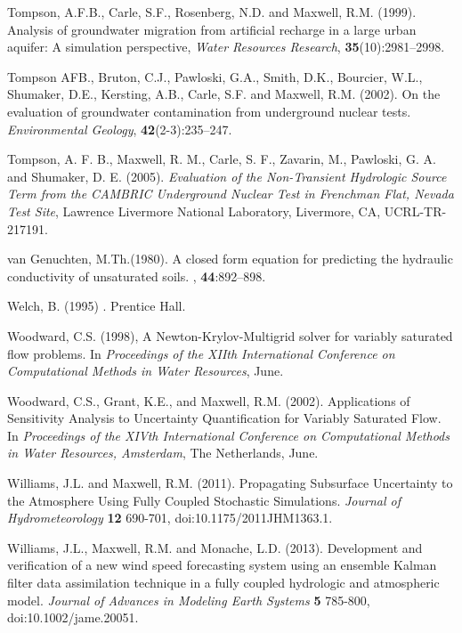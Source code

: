 \begin{thebibliography}{999}
  Tompson, A.F.B., Carle, S.F., Rosenberg, N.D. and Maxwell, R.M. 
 (1999). Analysis of groundwater migration from artificial recharge in a large
 urban aquifer: A simulation perspective, {\em Water Resources
Research}, {\bf 35}(10):2981--2998.

Tompson AFB., Bruton, C.J., Pawloski, G.A., Smith, D.K., Bourcier, W.L., Shumaker, D.E., Kersting, A.B., Carle, S.F. and Maxwell, R.M. (2002). On the evaluation of groundwater contamination from underground nuclear tests.  {\em Environmental Geology}, {\bf 42}(2-3):235--247.

Tompson, A. F. B., Maxwell, R. M., Carle, S. F., Zavarin, M., Pawloski, G. A. and Shumaker, D. E. (2005). {\em Evaluation of the Non-Transient Hydrologic Source Term from the CAMBRIC Underground Nuclear Test in Frenchman Flat, Nevada Test Site}, Lawrence Livermore National Laboratory, Livermore, CA, UCRL-TR-217191.

{van Genuchten}, M.Th.(1980). 
\newblock A closed form equation for predicting the hydraulic conductivity of
  unsaturated soils.
, {\bf 44}:892--898.

Welch, B. (1995)
.
\newblock Prentice Hall.

Woodward, C.S. (1998),
\newblock A {N}ewton-{K}rylov-{M}ultigrid solver for variably saturated flow
  problems.
\newblock In {\em Proceedings of the XIIth International Conference on
  Computational Methods in Water Resources}, June.

Woodward, C.S., Grant,  K.E., and Maxwell, R.M. (2002). Applications of Sensitivity Analysis to Uncertainty Quantification for Variably Saturated Flow.
\newblock In {\em Proceedings of the XIVth International Conference on Computational Methods in Water Resources, Amsterdam}, The Netherlands, June.

Williams, J.L. and Maxwell, R.M. (2011). Propagating Subsurface Uncertainty to the Atmosphere Using Fully Coupled Stochastic Simulations. {\em Journal of Hydrometeorology} {\bf 12} 690-701, doi:10.1175/2011JHM1363.1.

Williams, J.L., Maxwell, R.M. and Monache, L.D. (2013). Development and verification of a new wind speed forecasting system using an ensemble Kalman filter data assimilation technique in a fully coupled hydrologic and atmospheric model. {\em Journal of Advances in Modeling Earth Systems} {\bf 5} 785-800, doi:10.1002/jame.20051.


\end{thebibliography}
